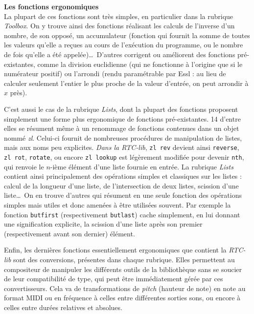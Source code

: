 \documentclass[a4paper,12pt]{article}
\begin{document}
\textbf{Les fonctions ergonomiques} \\
La plupart de ces fonctions sont très simples, en particulier dans la rubrique \emph{Toolbox}. On y trouve ainsi des fonctions réalisant les calculs de l'inverse d'un nombre, de son opposé, un accumulateur (fonction qui fournit la somme de toutes les valeurs qu'elle a reçues au cours de l'exécution du programme, ou le nombre de fois qu'elle a été appelée)\dots~D'autres corrigent ou améliorent des fonctions pré-existantes, comme la division euclidienne (qui ne fonctionne à l'origine que si le numérateur positif) ou l'arrondi (rendu paramétrable par Essl : au lieu de calculer seulement l'entier le plus proche de la valeur d'entrée, on peut arrondir à $x$ près).

C'est aussi le cas de la rubrique \emph{Lists}, dont la plupart des fonctions proposent simplement une forme plus ergonomique de fonctions pré-existantes. 14 d'entre elles se résument même à un renommage de fonctions contenues dans un objet nommé \emph{zl}. Celui-ci fournit de nombreuses procédures de manipulation de listes, mais aux noms peu explicites. \emph{Dans la RTC-lib}, \texttt{zl~rev} devient ainsi \texttt{reverse}, \texttt{zl~rot}, \texttt{rotate}, ou encore \texttt{zl~lookup} est légèrement modifiée pour devenir \texttt{nth}, qui renvoie le $n$-ième élément d'une liste fournie en entrée. La rubrique \emph{Lists} contient ainsi principalement des opérations simples et classiques sur les listes : calcul de la longueur d'une liste, de l'intersection de deux listes, scission d'une liste\dots~On en trouve d'autres qui résument en une seule fonction des opérations simples mais utiles et donc amenées à être utilisées souvent. Par exemple la fonction \texttt{butfirst} (respectivement \texttt{butlast}) cache simplement, en lui donnant une signification explicite, la scission d'une liste après son premier (respectivement avant son dernier) élément.

Enfin, les dernières fonctions essentiellement ergonomiques que contient la \emph{RTC-lib} sont des conversions, présentes dans chaque rubrique. Elles permettent au compositeur de manipuler les différents outils de la bibliothèque sans se soucier de leur compatibilité de type, qui peut être immédiatement gérée par ces convertisseurs. Cela va de transformations de \emph{pitch} (hauteur de note) en note au format MIDI ou en fréquence à celles entre différentes sorties sons, ou encore à celles entre durées relatives et absolues.
\end{document}
